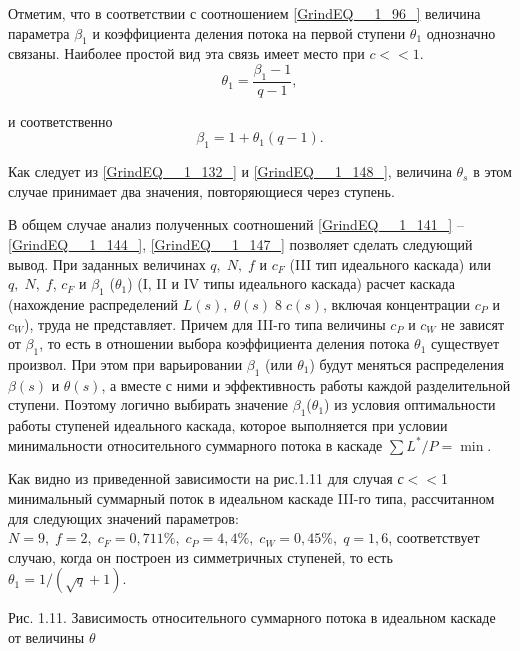 Отметим, что в соответствии с соотношением \ref{GrindEQ__1_96_} величина параметра $\beta _{1} $ и коэффициента деления потока на первой ступени $\theta _{1} $ однозначно связаны. Наиболее простой вид эта связь имеет место при $c<<1$.
\begin{equation} \label{GrindEQ__1_148_} 
\theta _{1} =\frac{\beta _{1} -1}{q-1} ,                                     
\end{equation} 

и соответственно
\begin{equation} \label{GrindEQ__1_149_} 
\beta _{1} =1+\theta _{1} (q-1).                           
\end{equation} 

Как следует из \ref{GrindEQ__1_132_} и \ref{GrindEQ__1_148_}, величина $\theta _{s} $ в этом случае принимает два значения, повторяющиеся через ступень.

В общем случае анализ полученных соотношений \ref{GrindEQ__1_141_} -- \ref{GrindEQ__1_144_}, \ref{GrindEQ__1_147_} позволяет сделать следующий вывод. При заданных величинах $q,\; N,\; f$ и $c_{F} $ (III тип идеального каскада) или $q,\; N,\; f$, $c_{F} $ и $\beta _{1} $ ($\theta _{1} $) (I, II и IV типы идеального каскада) расчет каскада (нахождение распределений $L(s),\; \theta (s)\; 8\; c(s)$, включая концентрации $c_{P} $ и $c_{W} $), труда не представляет. Причем для III-го типа величины $c_{P} $ и $c_{W} $ не зависят от $\beta _{1} $, то есть в отношении выбора коэффициента деления потока $\theta _{1} $ существует произвол. При этом при варьировании $\beta _{1} $ (или $\theta _{1} $) будут меняться распределения $\beta (s)$ и $\theta (s)$, а вместе с ними и эффективность работы каждой разделительной ступени. Поэтому логично выбирать значение $\beta _{1} $($\theta _{1} $) из условия оптимальности работы ступеней идеального каскада, которое выполняется при условии минимальности относительного суммарного потока в каскаде $\sum L^{*} /P=\min  $.

Как видно из приведенной зависимости на рис.1.11 для случая \textit{с}$\mathrm{<}$$\mathrm{<}$1 минимальный суммарный поток в идеальном каскаде III-го типа, рассчитанном для следующих значений параметров: $N=9,\; f=2,\; c_{F} =0,711\% ,\; c_{P} =4,4\% ,\; c_{W} =0,45\% ,\; q=1,6$, соответствует случаю, когда он построен из симметричных ступеней, то есть $\theta _{1} =1/\left(\sqrt{q} +1\right)$.



Рис. 1.11. Зависимость относительного суммарного потока в идеальном каскаде от величины $\theta _{} $

